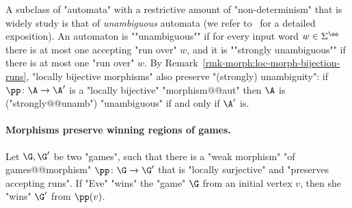 \documentclass[10pt,a4paper]{amsart}
\renewcommand{\SS}{\Sigma}
\begin{document}
A subclass of "automata" with a restrictive amount of "non-determinism" that is widely study is that of \emph{unambiguous} automata (we refer to~\cite{Colcombet15Unambiguity, Carton2003UnambiguousBuchi} for a detailed exposition). An automaton is \AP""unambiguous"" if for every input word $w\in \SS^\oo$ there is at most one accepting "run over" $w$, and it is ""strongly unambiguous"" if there is at most one "run over" $w$. By Remark~\ref{rmk-morph:loc-morph-bijection-runs}, "locally bijective morphisms" also preserve "(strongly) unambiguity": if $\pp\colon \A \to \A'$ is a "locally bijective" "morphism@@aut" then $\A$ is ("strongly@@unamb") "unambiguous" if and only if  $\A'$ is.


\paragraph*{Morphisms preserve winning regions of games.}
\begin{lemma}\label{lemma-morph:surj-mappings-preserve-games}
	Let $\G, \G'$ be two "games", such that there is a "weak morphism" "of games@@morphism" $\pp\colon \G \to \G'$ that is "locally surjective" and "preserves accepting runs". If "Eve" "wins" the "game" $\G$ from an initial vertex $v$, then she "wins" $\G'$ from $\pp(v)$.
\end{lemma}
\end{document}
